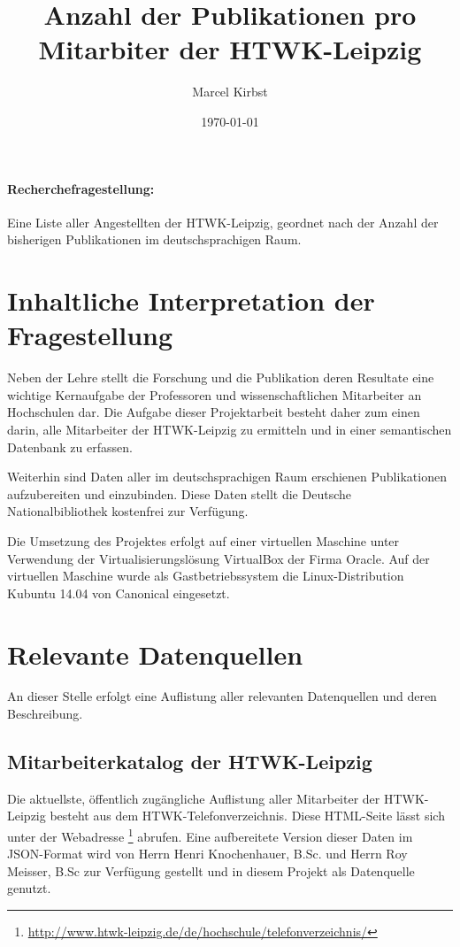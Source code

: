 \documentclass[parskip]{scrartcl}
\begin{document}
\subject{Projektdokumentation im Modul Semantic Web}
\title{Anzahl der Publikationen pro Mitarbiter der HTWK-Leipzig}
\author{Marcel Kirbst}
\date{\today}

\maketitle


\paragraph{Recherchefragestellung: }
Eine Liste aller Angestellten der HTWK-Leipzig, geordnet nach der Anzahl der bisherigen Publikationen im deutschsprachigen Raum.

\section{Inhaltliche Interpretation der Fragestellung}

Neben der Lehre stellt die Forschung und die Publikation deren Resultate eine wichtige Kernaufgabe der Professoren und wissenschaftlichen Mitarbeiter an Hochschulen dar. 
Die Aufgabe dieser Projektarbeit besteht daher zum einen darin, alle Mitarbeiter der HTWK-Leipzig zu ermitteln und in einer semantischen Datenbank zu erfassen. 

Weiterhin sind Daten aller im deutschsprachigen Raum erschienen Publikationen aufzubereiten und einzubinden. Diese Daten stellt die Deutsche Nationalbibliothek kostenfrei zur Verfügung.

Die Umsetzung des Projektes erfolgt auf einer virtuellen Maschine unter Verwendung der Virtualisierungslösung VirtualBox der Firma Oracle. Auf der virtuellen Maschine wurde als Gastbetriebssystem die Linux-Distribution Kubuntu 14.04 von Canonical eingesetzt. 

\section{Relevante Datenquellen}

An dieser Stelle erfolgt eine Auflistung aller relevanten Datenquellen und deren Beschreibung.

\subsection{Mitarbeiterkatalog der HTWK-Leipzig}

Die aktuellste, öffentlich zugängliche Auflistung aller Mitarbeiter der HTWK-Leipzig besteht aus dem HTWK-Telefonverzeichnis. Diese HTML-Seite lässt sich unter der Webadresse \footnote{\url{http://www.htwk-leipzig.de/de/hochschule/telefonverzeichnis/}} abrufen.
Eine aufbereitete Version dieser Daten im JSON-Format wird von Herrn Henri Knochenhauer, B.Sc. und Herrn Roy Meisser, B.Sc zur Verfügung gestellt und in diesem Projekt als Datenquelle genutzt.
\end{document}
